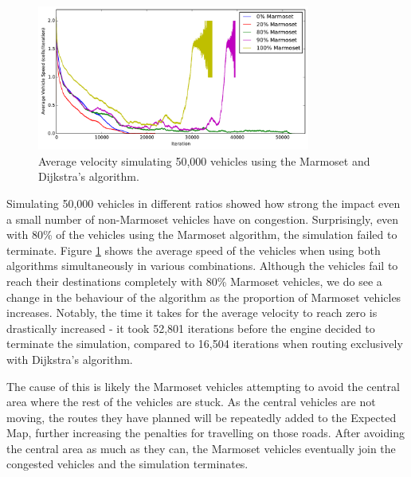 \documentclass[ %
                    author={Alexander Hill},
                supervisor={Dr. Benjamin Sach},
                    degree={MEng},
                     title={MARMOSET},
                  subtitle={Multi-Agent Route Management using Online Simulation for Efficient Transportation},
                      type={research},
                      year={2016} ]{dissertation}
\begin{document}
\begin{figure}[h]
    \centering
    \includegraphics[width=0.8\textwidth]{ratio-av.pdf}
    \caption{Average velocity simulating 50,000 vehicles using the Marmoset and Dijkstra's algorithm.}\label{fig:ratio-av}
\end{figure}

Simulating 50,000 vehicles in different ratios showed how strong the impact even
a small number of non-Marmoset vehicles have on congestion. Surprisingly, even
with 80\% of the vehicles using the Marmoset algorithm, the simulation failed to
terminate. Figure \ref{fig:ratio-av} shows the average speed of the vehicles
when using both algorithms simultaneously in various combinations. Although the
vehicles fail to reach their destinations completely with 80\% Marmoset
vehicles, we do see a change in the behaviour of the algorithm as the proportion
of Marmoset vehicles increases. Notably, the time it takes for the average
velocity to reach zero is drastically increased - it took 52,801 iterations
before the engine decided to terminate the simulation, compared to 16,504 iterations
when routing exclusively with Dijkstra's algorithm.

The cause of this is likely the Marmoset vehicles attempting to avoid the
central area where the rest of the vehicles are stuck. As the central vehicles
are not moving, the routes they have planned will be repeatedly added to the
Expected Map, further increasing the penalties for travelling on those roads.
After avoiding the central area as much as they can, the Marmoset vehicles
eventually join the congested vehicles and the simulation terminates.
\end{document}
